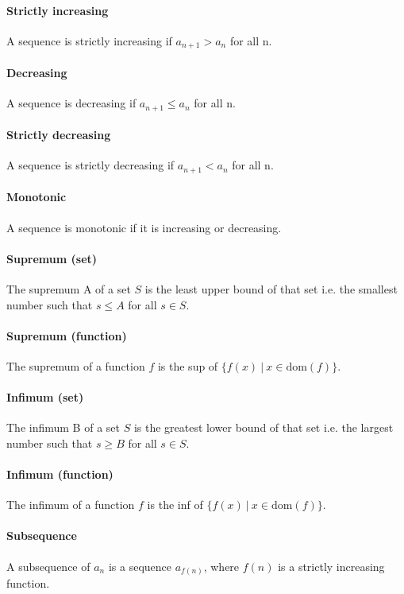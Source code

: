 \documentclass{scrartcl}
\begin{document}
\paragraph{Strictly increasing}
A sequence is strictly increasing if $ a_{n + 1} > a_{n} $ for all n.

\paragraph{Decreasing}
A sequence is decreasing if $ a_{n + 1} \leq a_{n} $ for all n.

\paragraph{Strictly decreasing}
A sequence is strictly decreasing if $ a_{n + 1} < a_{n} $ for all n.

\paragraph{Monotonic}
A sequence is monotonic if it is increasing or decreasing.

\paragraph{Supremum (set)}
The supremum A of a set $ S $ is the least upper bound of that set i.e. the smallest number such that $ s \leq A $ for all $ s \in S $.

\paragraph{Supremum (function)}
The supremum of a function $ f $ is the sup of $ \{f(x) \ | \ x \in \textrm{dom}(f)\} $.

\paragraph{Infimum (set)}
The infimum B of a set $ S $ is the greatest lower bound of that set i.e. the largest number such that $ s \geq B $ for all $ s \in S $.

\paragraph{Infimum (function)}
The infimum of a function $ f $ is the inf of $ \{f(x) \ | \ x \in \textrm{dom}(f)\} $.

\paragraph{Subsequence}
A subsequence of $ a_{n} $ is a sequence $ a_{f(n)} $, where $ f(n) $ is a strictly increasing function.
\end{document}
